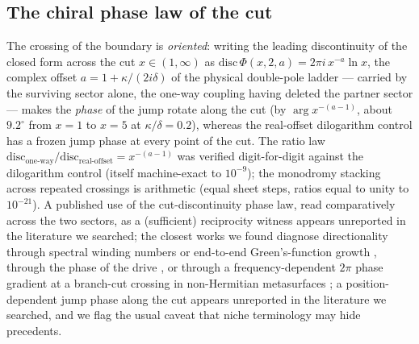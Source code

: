 \documentclass[11pt,a4paper]{article}
\begin{document}
\subsection{The chiral phase law of the cut}
\label{sec:chiral}

The crossing of the boundary is
\emph{oriented}: writing the leading discontinuity of the closed form
across the cut $x \in (1,\infty)$ as
$\mathrm{disc}\,\Phi(x,2,a) = 2\pi i\, x^{-a} \ln x$, the complex offset
$a = 1 + \kappa/(2i\delta)$ of the physical double-pole ladder --- carried
by the surviving sector alone, the one-way coupling having deleted the
partner sector --- makes the
\emph{phase} of the jump rotate along the cut (by
$\arg x^{-(a-1)}$, about $9.2^\circ$ from $x=1$ to $x=5$ at
$\kappa/\delta = 0.2$), whereas the real-offset dilogarithm control has a
frozen jump phase at every point of the cut. The ratio law
$\mathrm{disc}_{\text{one-way}}/\mathrm{disc}_{\text{real-offset}}
= x^{-(a-1)}$ was verified digit-for-digit against the dilogarithm
control (itself machine-exact to $10^{-9}$); the monodromy stacking
across repeated crossings is arithmetic (equal sheet steps, ratios equal
to unity to $10^{-21}$). A published use of the cut-discontinuity phase
law, read comparatively across the two sectors, as a (sufficient)
reciprocity witness appears unreported in the literature we searched; the
closest works
we found diagnose directionality through spectral winding numbers or
end-to-end Green's-function growth \cite{HuWang2023}, through the phase
of the drive \cite{McDonald2018}, or through a frequency-dependent
$2\pi$ phase gradient at a branch-cut crossing in non-Hermitian
metasurfaces \cite{Colom2023}; a position-dependent jump
phase along the cut appears unreported in the literature we searched, and
we flag the usual caveat that niche
terminology may hide precedents.
\end{document}
